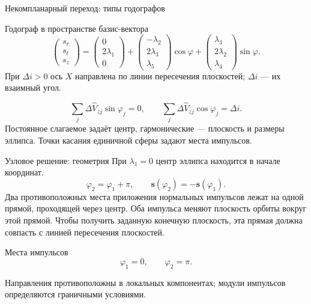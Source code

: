 \documentclass[11pt,aspectratio=169,t]{beamer}
\newcommand{\derivationmathspacing}{%
  \setlength{\abovedisplayskip}{2pt}%
  \setlength{\belowdisplayskip}{3pt}%
  \setlength{\abovedisplayshortskip}{2pt}%
  \setlength{\belowdisplayshortskip}{2pt}%
  \setlength{\jot}{2pt}}
\begin{document}
\begin{frame}{Некомпланарный переход: типы годографов}
\relax
\derivationmathspacing
\centering

\end{frame}

\begin{frame}{Годограф в пространстве базис-вектора}
\relax
\derivationmathspacing
\[
\begin{pmatrix}s_r\\s_t\\s_z\end{pmatrix}
=\begin{pmatrix}0\\2\lambda_1\\0\end{pmatrix}
+\begin{pmatrix}-\lambda_2\\2\lambda_3\\\lambda_5\end{pmatrix}\cos\varphi
+\begin{pmatrix}\lambda_3\\2\lambda_2\\\lambda_4\end{pmatrix}\sin\varphi.
\]
\justifying
При $\Delta i>0$ ось $X$ направлена по линии пересечения плоскостей;
$\Delta i$ --- их взаимный угол.
\par\smallskip
\[
\sum_j\Delta\widehat V_{zj}\sin\varphi_j=0,\qquad
\sum_j\Delta\widehat V_{zj}\cos\varphi_j=\Delta i.
\]
\justifying
Постоянное слагаемое задаёт центр, гармонические --- плоскость
и размеры эллипса. Точки касания единичной сферы задают места импульсов.
\end{frame}

\begin{frame}{Узловое решение: геометрия}
\relax
\derivationmathspacing
При $\lambda_1=0$ центр эллипса находится в начале координат.
\[
\varphi_2=\varphi_1+\pi,\qquad
\boldsymbol s(\varphi_2)=-\boldsymbol s(\varphi_1).
\]
\justifying
Два противоположных места приложения нормальных импульсов лежат
на одной прямой, проходящей через центр. Оба импульса меняют плоскость
орбиты вокруг этой прямой. Чтобы получить заданную конечную плоскость,
эта прямая должна совпасть с линией пересечения плоскостей.
\par
\begin{block}{Места импульсов}
\[
\varphi_1=0,\qquad \varphi_2=\pi.
\]
\end{block}
\justifying
Направления противоположны в локальных компонентах;
модули импульсов определяются граничными условиями.
\end{frame}
\end{document}
